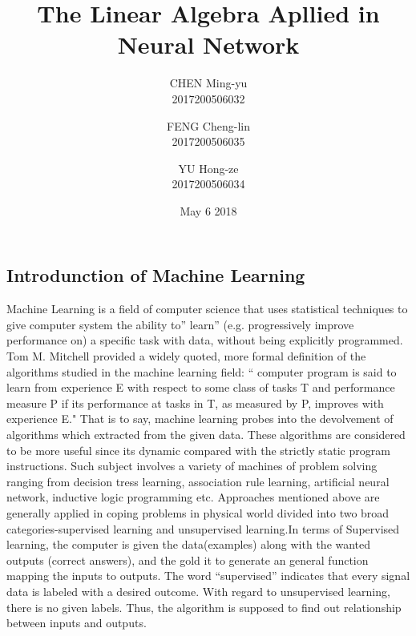 \documentclass{article}
\title{The Linear Algebra Apllied in Neural Network}
\author{CHEN Ming-yu\\2017200506032\\
\and FENG Cheng-lin\\2017200506035\\
\and YU Hong-ze\\2017200506034\\}
\date{May 6 2018}
\begin{document}
\maketitle
\begin{spacing}{2.0}
\linespread{2}


\section{Introdunction of Machine Learning}
Machine Learning is a field of computer science that uses statistical techniques to give computer system the ability to” learn” (e.g. progressively improve performance on) a specific task with data, without being explicitly programmed. Tom M. Mitchell provided a widely quoted, more formal definition of the algorithms studied in the machine learning field:
`` computer program is said to learn from experience E with respect to some class of tasks T and performance measure P if its performance at tasks in T, as measured by P, improves with experience E." \cite{bibitem1} That is to say, machine learning probes into the devolvement of algorithms which extracted from the given data. These algorithms are considered to be more useful since its dynamic compared with the strictly static program instructions. Such subject involves a variety of machines of problem solving ranging from decision tress learning, association rule learning, artificial neural network, inductive logic programming etc. Approaches mentioned above are generally applied in coping problems in physical world divided into two broad categories-supervised learning and unsupervised learning.In terms of Supervised learning, the computer is given the data(examples) along with the wanted outputs (correct answers), and the gold it to generate an general function mapping the inputs to outputs. The word “supervised” indicates that every signal data is labeled with a desired outcome. With regard to unsupervised learning, there is no given labels. Thus, the algorithm is supposed to find out relationship between inputs and outputs.


\end{spacing}
\end{document}
